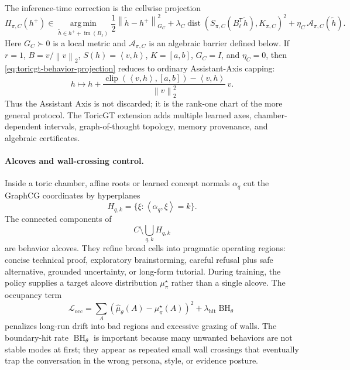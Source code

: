 \documentclass[11pt]{article}
\theoremstyle{definition}
\theoremstyle{plain}
\theoremstyle{remark}
\numberwithin{equation}{section}
\newcommand{\argmin}{\operatorname*{arg\,min}}
\newcommand{\norm}[1]{\left\lVert #1\right\rVert}
\newcommand{\ip}[2]{\left\langle #1,#2\right\rangle}
\newcommand{\transpose}{^{\mathsf T}}
\begin{document}
The inference-time correction is the cellwise projection
\begin{equation}
  \Pi_{\pi,C}(h^+)
  \in
  \argmin_{\tilde h\in h^++\operatorname{im}(B_\ell)}
  \frac12\norm{\tilde h-h^+}_{G_C}^2
  +\lambda_C\operatorname{dist}(S_{\pi,C}(B_\ell\transpose \tilde h),K_{\pi,C})^2
  +\eta_C\,\mathcal A_{\pi,C}(\tilde h).
  \label{eq:toricgt-behavior-projection}
\end{equation}
Here $G_C\succ0$ is a local metric and $\mathcal A_{\pi,C}$ is an algebraic barrier defined below.  If $r=1$, $B=v/\norm{v}_2$, $S(h)=\ip{v}{h}$, $K=[a,b]$, $G_C=I$, and $\eta_C=0$, then \eqref{eq:toricgt-behavior-projection} reduces to ordinary Assistant-Axis capping:
\begin{equation}
  h\longmapsto
  h+\frac{\operatorname{clip}(\ip{v}{h},[a,b])-\ip{v}{h}}{\norm{v}_2^2}\,v .
\end{equation}
Thus the Assistant Axis is not discarded; it is the rank-one chart of the more general protocol.  The ToricGT extension adds multiple learned axes, chamber-dependent intervals, graph-of-thought topology, memory provenance, and algebraic certificates.

\paragraph{Alcoves and wall-crossing control.}
Inside a toric chamber, affine roots or learned concept normals $\alpha_q$ cut the GraphCG coordinates by hyperplanes
\begin{equation}
  H_{q,k}=\{\xi:\ip{\alpha_q}{\xi}=k\}.
\end{equation}
The connected components of
\begin{equation}
  C\setminus \bigcup_{q,k}H_{q,k}
\end{equation}
are behavior alcoves.  They refine broad cells into pragmatic operating regions: concise technical proof, exploratory brainstorming, careful refusal plus safe alternative, grounded uncertainty, or long-form tutorial.  During training, the policy supplies a target alcove distribution $\mu^\star_\pi$ rather than a single alcove.  The occupancy term
\begin{equation}
  \mathcal L_{\mathrm{occ}}
  =
  \sum_A\left(\widehat\mu_\theta(A)-\mu_\pi^\star(A)\right)^2
  +\lambda_{\mathrm{hit}}\operatorname{BH}_\theta
\end{equation}
penalizes long-run drift into bad regions and excessive grazing of walls.  The boundary-hit rate $\operatorname{BH}_\theta$ is important because many unwanted behaviors are not stable modes at first; they appear as repeated small wall crossings that eventually trap the conversation in the wrong persona, style, or evidence posture.
\end{document}

